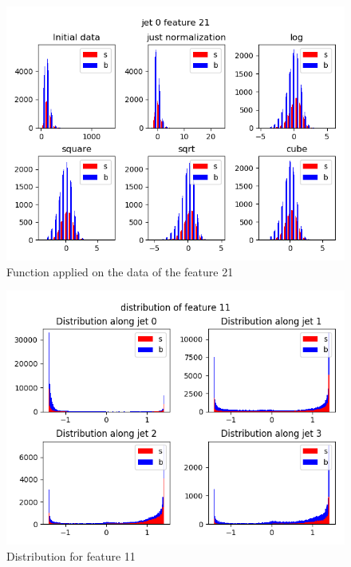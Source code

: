 \documentclass[10pt,conference,compsocconf]{IEEEtran}
\begin{document}
\begin{figure}[tbp]
  \centering
  \includegraphics[width=\columnwidth]{21_0}
  \caption{Function applied on the data of the feature 21}
  \vspace{-3mm}
  \label{fig:feature21function}
\end{figure}
\begin{figure}[tbp]
  \centering
  \includegraphics[width=\columnwidth]{feature11}
  \caption{Distribution for feature 11}
  \vspace{-3mm}
  \label{fig:feature11}
\end{figure}
\end{document}
